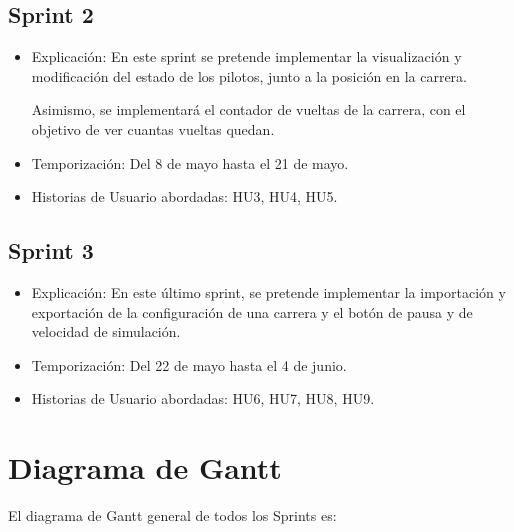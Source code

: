 \subsection{Sprint 2}

\begin{itemize}
    \item Explicación: En este sprint se pretende implementar la visualización y modificación del estado de los pilotos, junto a la posición en la carrera. 
    
    Asimismo, se implementará el contador de vueltas de la carrera, con el objetivo de ver cuantas vueltas quedan.
    \item Temporización: Del 8 de mayo hasta el 21 de mayo.
    \item Historias de Usuario abordadas: HU3, HU4, HU5.
\end{itemize}

\subsection{Sprint 3}

\begin{itemize}
    \item Explicación: En este último sprint, se pretende implementar la importación y exportación de la configuración de una carrera y el botón de pausa y de velocidad de simulación.
    \item Temporización: Del 22 de mayo hasta el 4 de junio.
    \item Historias de Usuario abordadas: HU6, HU7, HU8, HU9.
\end{itemize}

\section{Diagrama de Gantt}

El diagrama de Gantt general de todos los Sprints es:


\begin{center}
\end{center}


